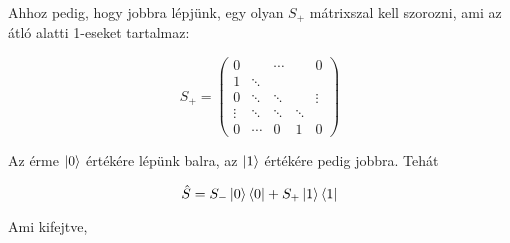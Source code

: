 Ahhoz pedig, hogy jobbra lépjünk, egy olyan $S_{+}$ mátrixszal kell szorozni,
ami az átló alatti 1-eseket tartalmaz:

\begin{center}
  \[ S_{+} =
    \left(
    \begin{array}{ccccc}

        0      &        & \cdots &        & 0      \\
        1      & \ddots &        &        &        \\
        0      & \ddots & \ddots &        & \vdots \\
        \vdots & \ddots & \ddots & \ddots &        \\
        0      & \cdots & 0      & 1      & 0
      \end{array}
    \right)
  \]
\end{center}

Az érme $\ket{0}$ értékére lépünk balra, az $\ket{1}$ értékére pedig jobbra.
Tehát

\begin{center}
  \[ \hat{S} = S_{-}\ket{0}\bra{0} + S_{+}\ket{1}\bra{1}
  \]
\end{center}

Ami kifejtve,

